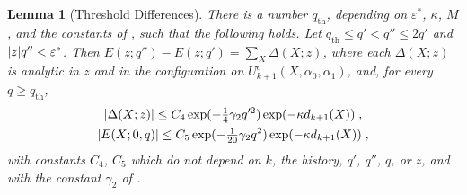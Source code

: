 \documentclass[11pt]{preprint}
\DeclarePairedDelimiter{\abs}{\lvert}{\rvert}
\numberwithin{equation}{section}
\newtheorem{lemma}{Lemma}[section]
\theoremstyle{definition}
\theoremstyle{remark}
\theoremstyle{plain}
\begin{document}
\begin{lemma}[Threshold Differences]\label{lem:threshold-differences}
There is a number $q_{\mathrm{th}}$, depending on $\varepsilon^*$, $\kappa$, $M$, and the constants of \cite{BalabanRG2}, such that the following holds. Let $q_{\mathrm{th}} \leq q' < q'' \leq 2q'$ and $\abs{z}q'' < \varepsilon^*$. Then $E(z; q'') - E(z; q') = \sum_X\Delta(X; z)$, where each $\Delta(X; z)$ is analytic in $z$ and in the configuration on $U^c_{k+1}(X, \alpha_0, \alpha_1)$, and, for every $q \geq q_{\mathrm{th}}$,
\begin{equation}\label{eq:threshold-difference}
    \begin{gathered}
        \abs{\Delta(X; z)} \leq C_4\exp(-\tfrac14\gamma_2q'^2)\exp(-\kappa d_{k+1}(X))\;,
        \\
        \abs{E(X; 0, q)} \leq C_5\exp(-\tfrac{1}{20}\gamma_2q^2)\exp(-\kappa d_{k+1}(X))\;,
    \end{gathered}
\end{equation}
with constants $C_4$, $C_5$ which do not depend on $k$, the history, $q'$, $q''$, $q$, or $z$, and with the constant $\gamma_2$ of \cite[(2.22)]{BalabanRG2}.
\end{lemma}
\end{document}
